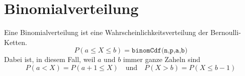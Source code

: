 \documentclass{article}
\begin{document}
\section{Binomialverteilung}
Eine Binomialverteilung ist eine Wahrscheinlichkeitsverteilung der Bernoulli-Ketten. 
\[
 P(a \le X \le b) = \texttt{binomCdf(n,p,a,b)}
\] 
Dabei ist, in diesem Fall, weil $a$ und $b$ immer ganze Zaheln sind
\[
 P(a < X) = P(a+1 \le X)
 \quad \text{und} \quad 
 P(X > b) = P(X \le b-1)
\]
\end{document}
